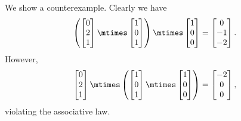 \begin{solution}
    We show a counterexample.
    Clearly we have
    \begin{equation}
        \left(
        \begin{bmatrix}
            0 \\ 2\\ 1
        \end{bmatrix}\mtimes
        \begin{bmatrix}
            1 \\ 0 \\ 1
        \end{bmatrix}
        \right)
        \mtimes
        \begin{bmatrix}
            1 \\ 0 \\ 0
        \end{bmatrix}
        =
        \begin{bmatrix}
            0 \\-1\\-2
        \end{bmatrix}.
    \end{equation}
    However,
    \begin{equation}
        \begin{bmatrix}
            0 \\ 2\\ 1
        \end{bmatrix}\mtimes \left(\begin{bmatrix}
            1 \\ 0 \\ 1
        \end{bmatrix}\mtimes
        \begin{bmatrix}
            1 \\ 0 \\ 0
        \end{bmatrix}\right)
        =\begin{bmatrix}
            -2 \\0\\0
        \end{bmatrix},
    \end{equation}
    violating the associative law.
\end{solution}

